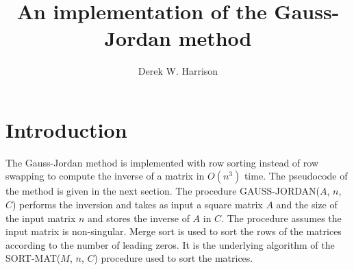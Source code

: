 \documentclass[11]{Report}
\begin{document}
\author{Derek W. Harrison}
\title{An implementation of the Gauss-Jordan method}

\maketitle
\section*{Introduction}
The Gauss-Jordan method is implemented with row sorting instead of row swapping to compute the inverse of a matrix in $O \left( n^3 \right) $ time. The pseudocode of the method is given in the next section. The procedure GAUSS-JORDAN($A$, $n$, $C$) performs the inversion and takes as input a square matrix $A$ and the size of the input matrix $n$ and stores the inverse of $A$ in $C$. The procedure assumes the input matrix is non-singular. Merge sort is used to sort the rows of the matrices according to the number of leading zeros. It is the underlying algorithm of the SORT-MAT($M$, $n$, $C$) procedure used to sort the matrices. 

\clearpage
\end{document}
